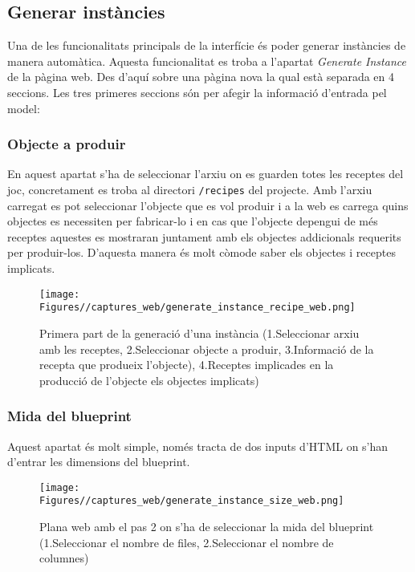 \subsection{Generar instàncies}\label{subsec:generar-instancies}
Una de les funcionalitats principals de la interfície és poder generar instàncies de manera automàtica. Aquesta funcionalitat es troba a l'apartat \textit{Generate Instance} de la pàgina web. Des d'aquí sobre una pàgina nova la qual està separada en 4 seccions. Les tres primeres seccions són per afegir la informació d'entrada pel model:

\subsubsection{Objecte a produir}
En aquest apartat s'ha de seleccionar l'arxiu on es guarden totes les receptes del joc, concretament es troba al directori \texttt{/recipes} del projecte. Amb l'arxiu carregat es pot seleccionar l'objecte que es vol produir i a la web es carrega quins objectes es necessiten per fabricar-lo i en cas que l'objecte depengui de més receptes aquestes es mostraran juntament amb els objectes addicionals requerits per produir-los. D'aquesta manera és molt còmode saber els objectes i receptes implicats.
\begin{figure}[H]
    \centering
    \texttt{[image: Figures//captures\_web/generate\_instance\_recipe\_web.png]}
    \caption{Primera part de la generació d'una instància (1.Seleccionar arxiu amb les receptes, 2.Seleccionar objecte a produir, 3.Informació de la recepta que produeix l'objecte), 4.Receptes implicades en la producció de l'objecte els objectes implicats)}
    \label{fig:generate_instance_recipe}
\end{figure}

\subsubsection{Mida del blueprint}
Aquest apartat és molt simple, només tracta de dos inputs d'HTML on s'han d'entrar les dimensions del blueprint.
\begin{figure}[H]
    \centering
    \texttt{[image: Figures//captures\_web/generate\_instance\_size\_web.png]}
    \caption{Plana web amb el pas 2 on s'ha de seleccionar la mida del blueprint (1.Seleccionar el nombre de files, 2.Seleccionar el nombre de columnes)}
    \label{fig:generate_instance_size}
\end{figure}

